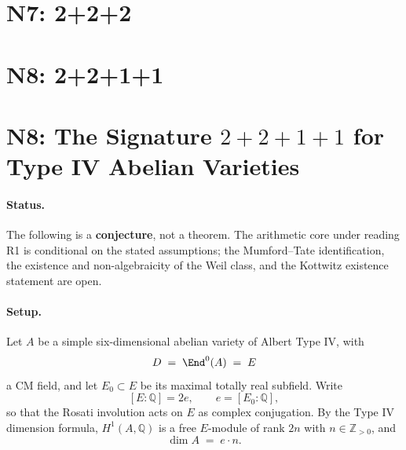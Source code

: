\documentclass{article}
\begin{document}
\section{N7: 2+2+2}

\section{N8: 2+2+1+1}
\section*{N8: The Signature \(2+2+1+1\) for Type IV Abelian Varieties}

\paragraph{Status.}
The following is a \textbf{conjecture}, not a theorem. The arithmetic core under reading R1 is conditional on the stated assumptions; the Mumford--Tate identification, the existence and non-algebraicity of the Weil class, and the Kottwitz existence statement are open.

\paragraph{Setup.}
Let \(A\) be a simple six-dimensional abelian variety of Albert Type IV, with
\[
D \;=\; \End^{0}(A) \;=\; E
\]
a CM field, and let \(E_{0}\subset E\) be its maximal totally real subfield. Write
\[
[E:\mathbb{Q}] = 2e, \qquad e = [E_{0}:\mathbb{Q}],
\]
so that the Rosati involution acts on \(E\) as complex conjugation. By the Type IV dimension formula, \(H^{1}(A,\mathbb{Q})\) is a free \(E\)-module of rank \(2n\) with \(n\in\mathbb{Z}_{>0}\), and
\[
\dim A \;=\; e\cdot n .
\]
\end{document}
